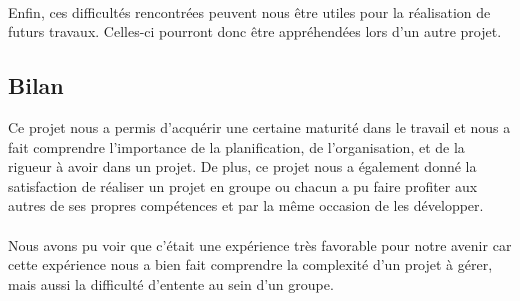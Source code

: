 \paragraph{}
Enfin, ces difficultés rencontrées peuvent nous être utiles pour la réalisation de futurs travaux. Celles-ci pourront donc être appréhendées lors d'un autre projet.

\subsection{Bilan}

Ce projet nous a permis d’acquérir une certaine maturité dans le travail et nous a fait comprendre l’importance de la planification, de l’organisation, et de la rigueur à avoir dans un projet. De plus, ce projet nous a également donné la satisfaction de réaliser un projet en groupe ou chacun a pu faire profiter aux autres de ses propres compétences et par la même occasion de les développer.
\paragraph{}
Nous avons pu voir que c'était une expérience très favorable pour notre avenir car cette
expérience nous a bien fait comprendre la complexité d’un projet à gérer, mais aussi la difficulté d’entente au sein d’un groupe.